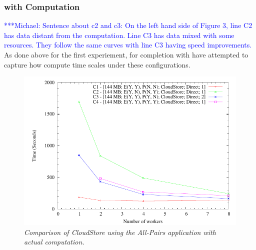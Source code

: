 \documentclass{rspublic}
\newcommand{\micnote}[1]{ {\textcolor{blue} { ***Michael: #1 }}}
\begin{document}
\subsubsection{with Computation}  \micnote{Sentence about c2 and c3:  On
the left hand side of Figure 3, line C2 has data distant from the
computation.  Line C3 has data mixed with some resources.  They follow
the same curves with line C3 having speed improvements.} As done above
for the first experiement, for completion with have attempted to capture
how compute time scales under these configurations.
\begin{center}
\begin{figure}
\includegraphics[scale=.75]{data/graphs/CloudStoreCompute}
\caption{\textit{Comparison of CloudStore using the All-Pairs
application with actual computation.}}
\label{experiment3compute}
\end{figure}
\end{center}


\end{document}
